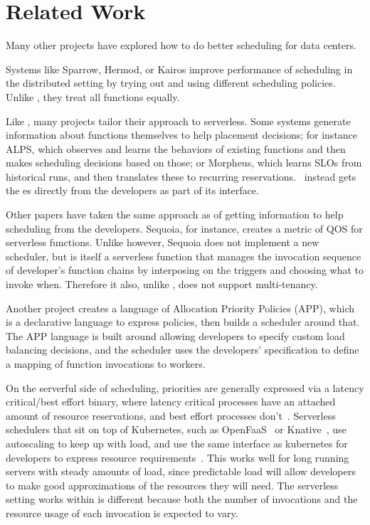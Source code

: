 \section{Related Work}

Many other projects have explored how to do better scheduling for data centers.
 
Systems like Sparrow\cite{sparrow}, Hermod\cite{hermod}, or Kairos\cite{kairos}
improve performance of scheduling in the distributed setting by trying out and
using different scheduling policies. Unlike \sys{}, they treat all functions
equally.

Like \sys{}, many projects tailor their approach to serverless. Some systems
generate information about functions themselves to help placement decisions; for
instance ALPS\cite{alps}, which observes and learns the behaviors of existing
functions and then makes scheduling decisions based on those; or
Morpheus\cite{morpheus}, which learns SLOs from historical runs, and then
translates these to recurring reservations.~\Sys{} instead gets the \class{}es
directly from the developers as part of its interface.

Other papers have taken the same approach as \sys{} of getting information to
help scheduling from the developers. Sequoia\cite{sequoia}, for instance,
creates a metric of QOS for serverless functions. Unlike \sys{} however, Sequoia
does not implement a new scheduler, but is itself a serverless function that
manages the invocation sequence of developer's function chains by interposing on
the triggers and choosing what to invoke when. Therefore it also, unlike
\sys{}, does not support multi-tenancy.

Another project\cite{app-paper} creates a language of Allocation Priority
Policies (APP), which is a declarative language to express policies, then builds
a scheduler around that. The APP language is built around allowing developers to
specify custom load balancing decisions, and the scheduler uses the developers'
specification to define a mapping of function invocations to workers. 

On the serverful side of scheduling, priorities are generally expressed via a
latency critical/best effort binary, where latency critical processes have an
attached amount of resource reservations, and best effort processes
don't~\cite{kubernetes-lc-be}. Serverless schedulers that sit on top of
Kubernetes, such as OpenFaaS~\cite{openfaas} or Knative~\cite{knative}, use
autoscaling to keep up with load, and use the same interface as kubernetes for
developers to express resource requirements~\cite{knative-res, openfaas-res}.
This works well for long running servers with steady amounts of load, since
predictable load will allow developers to make good approximations of the
resources they will need. The serverless setting \sys{} works within is
different because both the number of invocations and the resource usage of each
invocation is expected to vary. 
